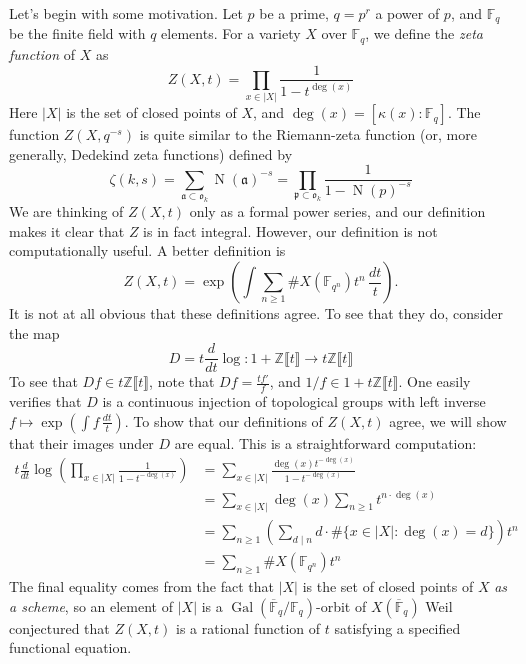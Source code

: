 \documentclass{article}
\newcommand{\dZ}{\mathbb{Z}}
\begin{document}
Let's begin with some motivation. Let $p$ be a prime, $q=p^r$ a power of $p$, 
and $\mathbb{F}_q$ be the finite field with $q$ elements. For a variety 
$X$ over $\mathbb{F}_q$, we define the \emph{zeta function} of $X$ as 
\[
  Z(X,t) = \prod_{x\in |X|} \frac{1}{1-t^{\deg(x)}}
\]
Here $|X|$ is the set of closed points of $X$, and 
$\deg(x)=[\kappa(x):\mathbb{F}_q]$. The function $Z(X,q^{-s})$ is quite 
similar to the Riemann-zeta function (or, more generally, Dedekind zeta 
functions) defined by 
\[
  \zeta(k,s) = \sum_{\mathfrak{a}\subset \mathfrak{o}_k} \operatorname{N}(\mathfrak{a})^{-s} = \prod_{\mathfrak{p}\subset \mathfrak{o}_k} \frac{1}{1-\operatorname{N}(p)^{-s}}
\]
We are thinking of $Z(X,t)$ only as a formal power series, and our definition 
makes it clear that $Z$ is in fact integral. However, our definition is not 
computationally useful. A better definition is 
\[
  Z(X,t) = \exp\left(\int \sum_{n\geqslant 1} \# X\left(\mathbb{F}_{q^n}\right) t^n\, \frac{dt}{t}\right)\text{.}
\]
It is not at all obvious that these definitions agree. To see that they 
do, consider the map 
\[
  D = t\frac{d}{dt}\log : 1+\dZ\llbracket t\rrbracket \to t\dZ\llbracket t\rrbracket
\]
To see that $D f\in t\dZ\llbracket t\rrbracket$, note that 
$Df=\frac{tf'}{f}$, and $1/f\in 1+t\dZ\llbracket t\rrbracket$. One easily 
verifies that $D$ is a continuous injection of topological groups with 
left inverse $f\mapsto \exp\left(\int f\, \frac{dt}{t}\right)$. To show that our definitions 
of $Z(X,t)$ agree, we will show that their images under $D$ are equal. This is a 
straightforward computation:
\begin{align*}
  t\frac{d}{dt} \log \left(\prod_{x\in |X|} \frac{1}{1-t^{-\deg(x)}}\right) 
    &= \sum_{x\in |X|} \frac{\deg(x) t^{-\deg(x)}}{1-t^{-\deg(x)}} \\
    &= \sum_{x\in |X|} \deg(x) \sum_{n\geqslant 1} t^{n\cdot \deg(x)} \\
    &= \sum_{n\geqslant 1} \left(\sum_{d\mid n} d\cdot \#\{x\in |X|:\deg(x)=d\}\right) t^n \\
    &= \sum_{n\geqslant 1} \# X\left(\mathbb{F}_{q^n}\right) t^n
\end{align*}
The final equality comes from the fact that $|X|$ is the set of closed points 
of $X$ \emph{as a scheme}, so an element of $|X|$ is a 
$\operatorname{Gal}(\overline{\mathbb{F}}_q/\mathbb{F}_q)$-orbit of 
$X(\overline{\mathbb{F}}_q)$
Weil conjectured that $Z(X,t)$ is a rational function of $t$ satisfying a 
specified functional equation. 
\end{document}
